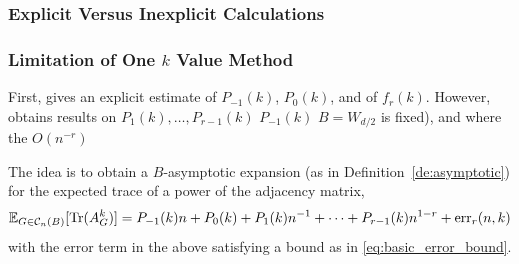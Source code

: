 \documentclass{memo-l}
\theoremstyle{plain}
\theoremstyle{definition}
\numberwithin{section}{chapter}
\numberwithin{equation}{chapter}
\DeclareMathOperator{\Tr}{Tr}
\theoremstyle{plain}
\theoremstyle{definition}
\newcommand\EE{\mathbb{E}}
\newcommand\cC{\mathcal{C}}
\begin{document}
{\subsubsection{Explicit Versus Inexplicit Calculations}

\subsubsection{Limitation of One $k$ Value Method}



First, \cite{broder} gives an explicit estimate of $P_{-1}(k)$, 
$P_{0}(k)$, and of $f_r(k)$.  However, \cite{friedman_random_graphs}
obtains results on $P_1(k),\ldots,P_{r-1}(k)$
$P_{-1}(k)$
$B=W_{d/2}$ is fixed), and where the $O(n^{-r})$


The idea is to obtain a $B$-asymptotic expansion 
(as in Definition~\ref{de:asymptotic}) for the expected trace
of a power of the adjacency matrix,
\begin{equation}\label{eq:broder_shamir_etc}
\EE_{G \in \cC_n(B)}[ \Tr(A_G^k) ] = 
P_{-1}(k) n + P_0(k) + P_1(k) n^{-1} + \cdots + P_{r-1}(k)
n^{1-r} + {\rm err}_r(n,k) 
\end{equation}
with the error term in the above satisfying a bound as in
\eqref{eq:basic_error_bound}.

}
\end{document}
